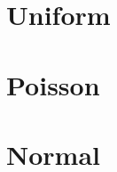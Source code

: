 \documentclass[12pt]{article}
\begin{document}
\section{Uniform}


\section{Poisson}


\section{Normal}









\end{document}
